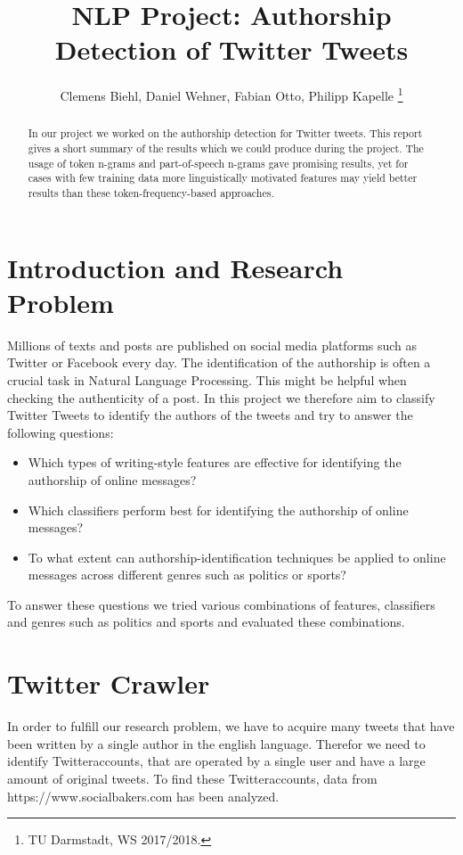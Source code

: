 \documentclass[journal, a4paper, 12pt]{IEEEtran}
\begin{document}
\title{NLP Project: Authorship Detection of Twitter Tweets}
\author{Clemens Biehl, Daniel Wehner, Fabian Otto, Philipp Kapelle
\thanks{TU Darmstadt, WS 2017/2018.}}
\maketitle

\begin{abstract}
In our project we worked on the authorship detection for Twitter tweets. This report gives a short summary of the results which we could produce during the project. The usage of token n-grams and part-of-speech n-grams gave promising results, yet for cases with few training data more linguistically motivated features may yield better results than these token-frequency-based approaches.
\end{abstract}
	
\section{Introduction and Research Problem}
Millions of texts and posts are published on social media platforms such as Twitter or Facebook every day. The identification of the authorship is often a crucial task in Natural Language Processing. This might be helpful when checking the authenticity of a post. In this project we therefore aim to classify Twitter Tweets to identify the authors of the tweets and try to answer the following questions:
\vspace{-2mm}
\begin{itemize}
\item Which types of writing-style features are effective for identifying the authorship of online messages?
\item Which classifiers perform best for identifying the authorship of online messages?
\item To what extent can authorship-identification techniques be applied to online messages across different genres such as politics or sports?
\end{itemize}
\vspace{-2mm}
To answer these questions we tried various combinations of features, classifiers and genres such as politics and sports and evaluated these combinations.

\section{Twitter Crawler}
In order to fulfill our research problem, we have to acquire many tweets that have been written by a single author in the english language. Therefor we need to identify Twitteraccounts, that are operated by a single user and have a large amount of original tweets. To find these Twitteraccounts, data from https://www.socialbakers.com has been analyzed. 
\end{document}
